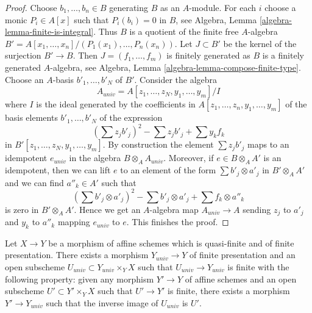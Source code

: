 \begin{proof}
Choose $b_1, \ldots, b_n \in B$ generating $B$ as an $A$-module.
For each $i$ choose a monic $P_i \in A[x]$ such that $P_i(b_i) = 0$
in $B$, see Algebra, Lemma \ref{algebra-lemma-finite-is-integral}.
Thus $B$ is a quotient of the finite free $A$-algebra
$B' = A[x_1, \ldots, x_n]/(P_1(x_1), \ldots, P_n(x_n))$.
Let $J \subset B'$ be the kernel of the surjection $B' \to B$.
Then $J =(f_1, \ldots, f_m)$ is finitely generated as $B$
is a finitely generated $A$-algebra, see
Algebra, Lemma \ref{algebra-lemma-compose-finite-type}.
Choose an $A$-basis $b'_1, \ldots, b'_N$ of $B'$.
Consider the algebra
$$
A_{univ} = A[z_1, \ldots, z_N, y_1, \ldots, y_m]/I
$$
where $I$ is the ideal generated by the coefficients in
$A[z_1, \ldots, z_n, y_1, \ldots, y_m]$
of the basis elements $b'_1, \ldots, b'_N$ of the expression
$$
(\sum z_j b'_j)^2 - \sum z_j b'_j + \sum y_k f_k
$$
in $B'[z_1, \ldots, z_N, y_1, \ldots, y_m]$. By construction
the element $\sum z_j b'_j$ maps to an idempotent $e_{univ}$ in the
algebra $B \otimes_A A_{univ}$. Moreover, if $e \in B \otimes_A A'$
is an idempotent, then we can lift $e$ to an element of the form
$\sum b'_j \otimes a'_j$ in $B' \otimes_A A'$ and we can find
$a''_k \in A'$ such that
$$
(\sum b'_j \otimes a'_j)^2 - \sum b'_j \otimes a'_j + \sum f_k \otimes a''_k
$$
is zero in $B' \otimes_A A'$. Hence we get an $A$-algebra map
$A_{univ} \to A$ sending $z_j$ to $a'_j$ and $y_k$ to $a''_k$
mapping $e_{univ}$ to $e$. This finishes the proof.
\end{proof}

\begin{lemma}
\label{lemma-open-and-closed-in-quasi-finite}
Let $X \to Y$ be a morphism of affine schemes which is quasi-finite and
of finite presentation. There exists a morphism $Y_{univ} \to Y$
of finite presentation and an open subscheme
$U_{univ} \subset Y_{univ} \times_Y X$ such that
$U_{univ} \to Y_{univ}$ is finite with the following property:
given any morphism $Y' \to Y$ of affine schemes
and an open subscheme $U' \subset Y' \times_Y X$
such that $U' \to Y'$ is finite, there exists a morphism
$Y' \to Y_{univ}$ such that the inverse image of $U_{univ}$ is $U'$.
\end{lemma}

